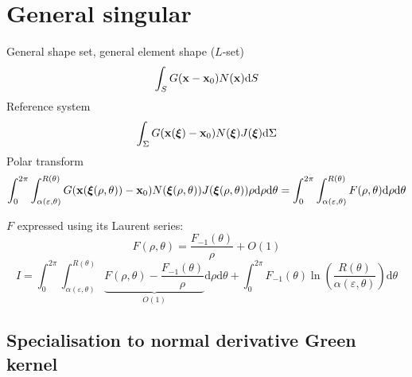 \documentclass[a4paper,11pt]{article}
\newcommand{\td}{\mathrm{d}}
\begin{document}
\section{General singular}

General shape set, general element shape ($L$-set)
%
\begin{equation}
\int_S G({\bf x}-{\bf x}_0) N({\bf x}) \td S
\end{equation}
%
Reference system
%
\begin{equation}
\int_{\Sigma} G({\bf x}(\bm{\xi})-{\bf x}_0) N(\bm{\xi}) J(\bm{\xi}) \td \Sigma
\end{equation}
%
Polar transform
%
\begin{equation}
\int_{0}^{2\pi}
\int_{\alpha(\varepsilon,\theta)}^{R(\theta)}
G({\bf x}(\bm{\xi}(\rho,\theta))-{\bf x}_0) N(\bm{\xi}(\rho,\theta)) J(\bm{\xi}(\rho,\theta)) \rho
\td \rho
\td \theta
=
\int_{0}^{2\pi}
\int_{\alpha(\varepsilon,\theta)}^{R(\theta)}
F(\rho, \theta)
\td \rho
\td \theta
\end{equation}

$F$ expressed using its Laurent series:
%
\begin{equation}
F(\rho, \theta) = \frac{F_{-1}(\theta)}{\rho} + O(1)
\end{equation}
%
\begin{equation}
I =
\int_{0}^{2\pi}
\int_{\alpha(\varepsilon,\theta)}^{R(\theta)}
\underbrace{
F(\rho, \theta) - \frac{F_{-1}(\theta)}{\rho}
}_{O(1)}
\td \rho
\td \theta
+
\int_{0}^{2\pi}
F_{-1}(\theta)
\ln \left(\frac{R(\theta)}{\alpha(\varepsilon,\theta)}\right)
\td \theta
\end{equation}

\subsection{Specialisation to normal derivative Green kernel}
\end{document}
